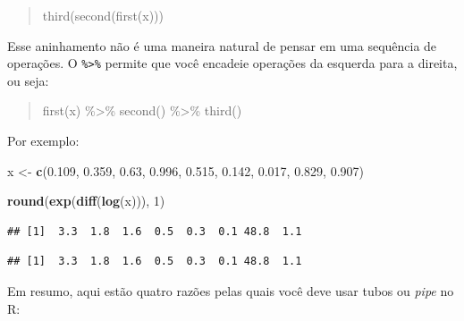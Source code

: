 \documentclass[]{book}
\newenvironment{Shaded}{\begin{snugshade}}{\end{snugshade}}
\newcommand{\CommentTok}[1]{\textcolor[rgb]{0.56,0.35,0.01}{\textit{#1}}}
\newcommand{\DecValTok}[1]{\textcolor[rgb]{0.00,0.00,0.81}{#1}}
\newcommand{\FloatTok}[1]{\textcolor[rgb]{0.00,0.00,0.81}{#1}}
\newcommand{\KeywordTok}[1]{\textcolor[rgb]{0.13,0.29,0.53}{\textbf{#1}}}
\newcommand{\NormalTok}[1]{#1}
\newcommand{\OperatorTok}[1]{\textcolor[rgb]{0.81,0.36,0.00}{\textbf{#1}}}
\newcommand{\StringTok}[1]{\textcolor[rgb]{0.31,0.60,0.02}{#1}}
\begin{document}
\begin{quote}
third(second(first(x)))
\end{quote}

Esse aninhamento não é uma maneira natural de pensar em uma sequência de operações. O \texttt{\%\textgreater{}\%} permite que você encadeie operações da esquerda para a direita, ou seja:

\begin{quote}
first(x) \%\textgreater\% second() \%\textgreater\% third()
\end{quote}

Por exemplo:

\begin{Shaded}
\begin{Highlighting}[]
\NormalTok{x <-}\StringTok{ }\KeywordTok{c}\NormalTok{(}\FloatTok{0.109}\NormalTok{, }\FloatTok{0.359}\NormalTok{, }\FloatTok{0.63}\NormalTok{, }\FloatTok{0.996}\NormalTok{, }\FloatTok{0.515}\NormalTok{, }\FloatTok{0.142}\NormalTok{, }\FloatTok{0.017}\NormalTok{, }\FloatTok{0.829}\NormalTok{, }\FloatTok{0.907}\NormalTok{)}

\KeywordTok{round}\NormalTok{(}\KeywordTok{exp}\NormalTok{(}\KeywordTok{diff}\NormalTok{(}\KeywordTok{log}\NormalTok{(x))), }\DecValTok{1}\NormalTok{)}
\end{Highlighting}
\end{Shaded}

\begin{verbatim}
## [1]  3.3  1.8  1.6  0.5  0.3  0.1 48.8  1.1
\end{verbatim}

\begin{Shaded}
\end{Shaded}

\begin{verbatim}
## [1]  3.3  1.8  1.6  0.5  0.3  0.1 48.8  1.1
\end{verbatim}

Em resumo, aqui estão quatro razões pelas quais você deve usar tubos ou \emph{pipe} no R:
\end{document}
